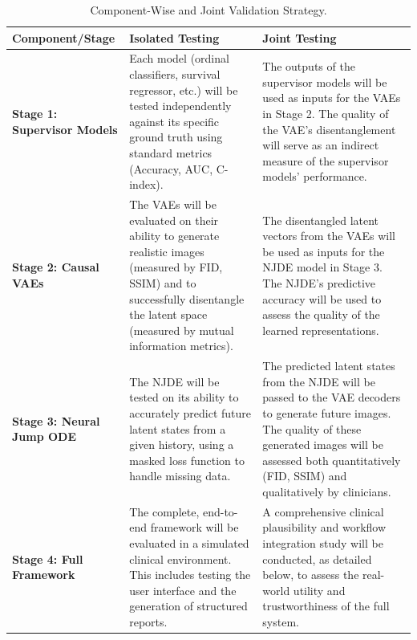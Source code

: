 \documentclass[11pt, a4paper]{article}
\begin{document}
\begin{table}[H]
    \centering
    \caption{Component-Wise and Joint Validation Strategy.}
    \label{tab:validation_strategy}
    \small
    \begin{tabular}{p{} p{} p{}}
        \toprule
        \textbf{Component/Stage} & \textbf{Isolated Testing} & \textbf{Joint Testing} \\
        \midrule
        \textbf{Stage 1: Supervisor Models} & Each model (ordinal classifiers, survival regressor, etc.) will be tested independently against its specific ground truth using standard metrics (Accuracy, AUC, C-index). & The outputs of the supervisor models will be used as inputs for the VAEs in Stage 2. The quality of the VAE's disentanglement will serve as an indirect measure of the supervisor models' performance. \\
        \addlinespace
        \textbf{Stage 2: Causal VAEs} & The VAEs will be evaluated on their ability to generate realistic images (measured by FID, SSIM) and to successfully disentangle the latent space (measured by mutual information metrics). & The disentangled latent vectors from the VAEs will be used as inputs for the NJDE model in Stage 3. The NJDE's predictive accuracy will be used to assess the quality of the learned representations. \\
        \addlinespace
        \textbf{Stage 3: Neural Jump ODE} & The NJDE will be tested on its ability to accurately predict future latent states from a given history, using a masked loss function to handle missing data. & The predicted latent states from the NJDE will be passed to the VAE decoders to generate future images. The quality of these generated images will be assessed both quantitatively (FID, SSIM) and qualitatively by clinicians. \\
        \addlinespace
        \textbf{Stage 4: Full Framework} & The complete, end-to-end framework will be evaluated in a simulated clinical environment. This includes testing the user interface and the generation of structured reports. & A comprehensive clinical plausibility and workflow integration study will be conducted, as detailed below, to assess the real-world utility and trustworthiness of the full system. \\
        \bottomrule
    \end{tabular}
\end{table}
\end{document}
